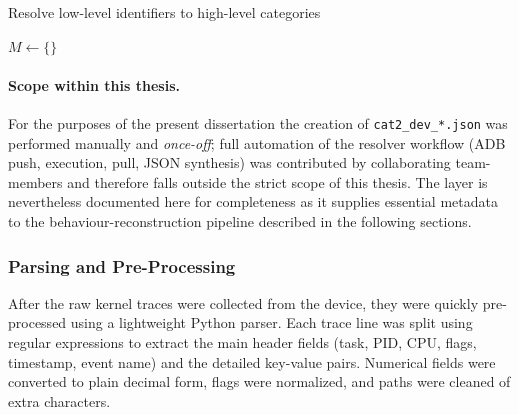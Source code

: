 \documentclass[a4paper,12pt]{report}
\begin{document}
\begin{algorithm}[H]
\footnotesize
\caption{Resolve low-level identifiers to high-level categories}
\label{alg:resolver}
\DontPrintSemicolon
{}
$M \leftarrow \{\}$
\BlankLine
{}
\BlankLine
{}
\end{algorithm}


\paragraph{Scope within this thesis.}
For the purposes of the present dissertation the creation of
\texttt{cat2\_dev\_*.json} was performed manually and
\emph{once-off}; full automation of the resolver workflow (ADB push,
execution, pull, JSON synthesis) was contributed by collaborating
team-members and therefore falls outside the strict scope of this
thesis.  The layer is nevertheless documented here for completeness
as it supplies essential metadata to the behaviour-reconstruction
pipeline described in the following sections.


\subsubsection{Parsing and Pre-Processing}
After the raw kernel traces were collected from the device, they were quickly pre-processed using a lightweight Python parser. Each trace line was split using regular expressions to extract the main header fields (task, PID, CPU, flags, timestamp, event name) and the detailed key-value pairs. Numerical fields were converted to plain decimal form, flags were normalized, and paths were cleaned of extra characters.
\end{document}
